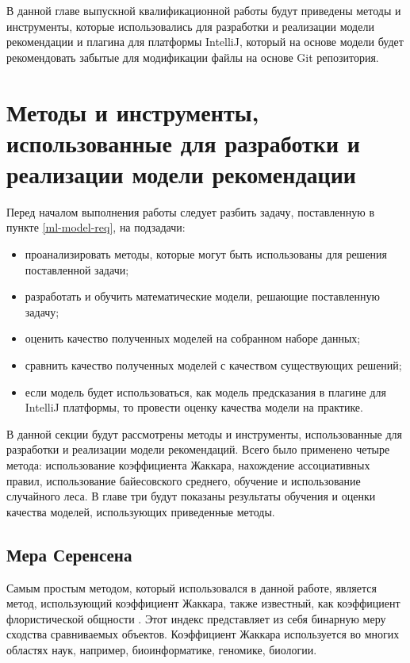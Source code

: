 В данной главе выпускной квалификационной работы будут приведены методы и инструменты, которые использовались для разработки и реализации модели рекомендации и плагина для платформы IntelliJ, который на основе модели будет рекомендовать забытые для модификации файлы на основе Git репозитория.

\section{Методы и инструменты, использованные для разработки и реализации модели рекомендации}\label{chapter2-models}
Перед началом выполнения работы следует разбить задачу, поставленную в пункте \ref{ml-model-req}, на подзадачи:
    \begin{itemize}
        \item проанализировать методы, которые могут быть использованы для решения поставленной задачи;
        \item разработать и обучить математические модели, решающие поставленную задачу;
        \item оценить качество полученных моделей на собранном наборе данных;
        \item сравнить качество полученных моделей с качеством существующих решений;
        \item если модель будет использоваться, как модель предсказания в плагине для IntelliJ платформы, то провести оценку качества модели на практике.
    \end{itemize}

В данной секции будут рассмотрены методы и инструменты, использованные для разработки и реализации модели рекомендаций. Всего было применено четыре метода: использование коэффициента Жаккара, нахождение ассоциативных правил, использование байесовского среднего, обучение и использование случайного леса. В главе три будут показаны результаты обучения и оценки качества моделей, использующих приведенные методы.
    \subsection{Мера Серенсена}\label{chapter-2-coef}
Самым простым методом, который использовался в данной работе, является метод, использующий коэффициент Жаккара, также известный, как коэффициент флористической общности \cite{jacard}. Этот индекс представляет из себя бинарную меру сходства сравниваемых объектов. Коэффициент Жаккара используется во многих областях наук, например, биоинформатике, геномике, биологии. 

